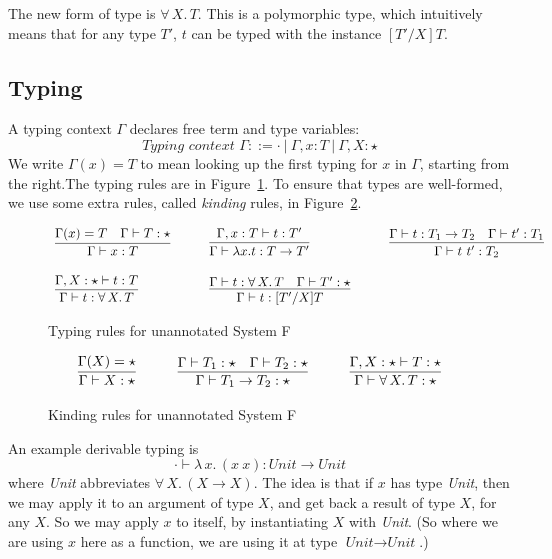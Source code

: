 \documentclass{article}
\begin{document}
The new form of type is $\forall\, X.\,T$.  This is a polymorphic
type, which intuitively means that for any type $T'$, $t$ can be typed
with the instance $[T'/X]T$.  

\subsection{Typing}

A typing context $\Gamma$ declares free term and type variables:
\[
\textit{Typing context }\Gamma ::= \cdot\ |\ \Gamma, x:T\ |\ \Gamma, X : \star
\]
We write $\Gamma(x) = T$ to mean looking up the first typing for $x$ in $\Gamma$,
starting from the right.The typing rules are in
Figure~\ref{fig:tp}.  To ensure that types are well-formed, we
use some extra rules, called \emph{kinding} rules, in Figure~\ref{fig:knd}.  

\begin{figure}
\[
\begin{array}{lllll}
\infer{\Gamma \vdash x : T}{\Gamma(x) = T & \Gamma \vdash T : \star} &\ \ \ &
\infer{\Gamma \vdash \lambda x . t : T \to T'}{\Gamma, x : T \vdash t : T'} &\ \ \ &
\infer{\Gamma \vdash t\ t' : T_2}{\Gamma \vdash t : T_1 \to T_2 & \Gamma \vdash t' : T_1} \\ \\
\infer{\Gamma \vdash t : \forall \,X.\,T}{\Gamma,X : \star \vdash t : T} &\ \ \ &
\infer{\Gamma \vdash t : [T'/X]T}{\Gamma \vdash t : \forall\, X.\,T & \Gamma \vdash T' : \star} &\ \ \ &\ 
\end{array}
\]
\caption{Typing rules for unannotated System F}
\label{fig:tp}
\end{figure}

\begin{figure}
\[
\begin{array}{lllll}
\infer{\Gamma \vdash X : \star}{\Gamma(X) = \star} &\ \ \ &
\infer{\Gamma \vdash T_1 \to T_2 : \star}{\Gamma \vdash T_1 : \star & \Gamma \vdash T_2 : \star} &\ \ \ &
\infer{\Gamma \vdash \forall\, X.\,T : \star}{\Gamma,X : \star \vdash T : \star}
\end{array}
\]
\caption{Kinding rules for unannotated System F}
\label{fig:knd}
\end{figure}

An example derivable typing is
\[
\cdot \vdash \lambda\,x.\,(x\ x) : \textit{Unit} \to \textit{Unit}
\]
\noindent where \textit{Unit} abbreviates $\forall\,X.\,(X \to X)$.  The
idea is that if $x$ has type \textit{Unit}, then we may apply it to an argument
of type $X$, and get back a result of type $X$, for any $X$.  So we may apply $x$
to itself, by instantiating $X$ with \textit{Unit}.  (So where we are using $x$ here
as a function, we are using it at type $\textit{Unit} \to \textit{Unit}$.)
\end{document}

